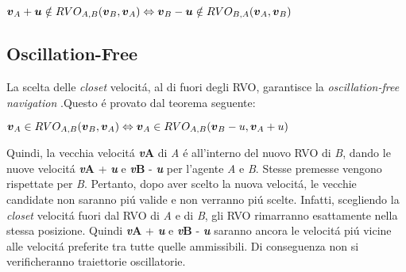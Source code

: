 \begin{legge}
\label{lex:sasi}
$\\ {\boldsymbol{v}_ A} + {\boldsymbol{u}} \notin RVO_{A,B}({\boldsymbol{v}_ B},{\boldsymbol{v}_ A}) \Leftrightarrow {\boldsymbol{v}_ B} - {\boldsymbol{u}} \notin RVO_{B,A}({\boldsymbol{v}_ A},{\boldsymbol{v}_ B})$
\end{legge}

\subsection{Oscillation-Free}

La scelta delle \textit{closet} velocit\'a, al di fuori degli RVO, garantisce la \textit{oscillation-free navigation} .Questo \'e provato dal teorema seguente:

\begin{teorema}

$\\{\boldsymbol{v}_ A} \in RVO_{A,B}({\boldsymbol{v}_ B}, {\boldsymbol{v}_A} ) \Leftrightarrow  {\boldsymbol{v}_ A} \in RVO_{A,B}({\boldsymbol{v}_ B - u }, {\boldsymbol{v}_A} + u )$
\end{teorema}

Quindi, la vecchia velocit\'a {\bfseries\textit{v}\ped A} di \textit{A} \'e all'interno del nuovo RVO di \textit{B}, dando le nuove velocit\'a {\bfseries\textit{v}\ped A} + {\bfseries\textit{u}} e {\bfseries\textit{v}\ped B} - {\bfseries\textit{u}} per l'agente \textit{A} e \textit{B}. Stesse premesse vengono rispettate per \textit{B}. 
Pertanto, dopo aver scelto la nuova velocit\'a, le vecchie candidate non saranno pi\'u valide e non verranno pi\'u scelte. Infatti, scegliendo la \textit{closet} velocit\'a fuori dal RVO di \textit{A} e di \textit{B}, gli RVO rimarranno esattamente nella stessa posizione.
Quindi {\bfseries\textit{v}\ped A} + {\bfseries\textit{u}} e {\bfseries\textit{v}\ped B} - {\bfseries\textit{u}} saranno ancora le velocit\'a pi\'u vicine alle velocit\'a preferite tra tutte quelle ammissibili. Di conseguenza non si verificheranno traiettorie oscillatorie.



